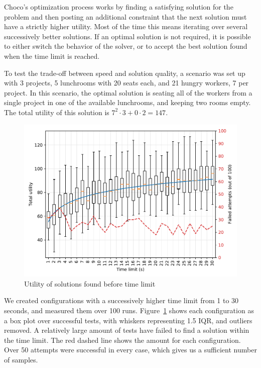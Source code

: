Choco's optimization process works by finding a satisfying solution for the problem and
then posting an additional constraint that the next solution must have a strictly higher
utility. Most of the time this means iterating over several successively better
solutions. If an optimal solution is not required, it is possible to either switch the
behavior of the solver, or to accept the best solution found when the time limit is
reached.

To test the trade-off between speed and solution quality, a scenario was set up with 3
projects, 5 lunchrooms with 20 seats each, and 21 hungry workers, 7 per project. In
this scenario, the optimal solution is seating all of the workers from a single project
in one of the available lunchrooms, and keeping two rooms empty. The total utility
of this solution is $7^2 \cdot 3 + 0 \cdot 2 = 147$.

\begin{figure}[ht]
    \centering
    \includegraphics[width=1\linewidth]{img/timelimits.pdf}
    \caption{Utility of solutions found before time limit}
    \label{fig:timelimits}
\end{figure}

We created configurations with a successively higher time limit from 1 to 30 seconds,
and measured them over 100 runs. Figure~\ref{fig:timelimits} shows each configuration as
a box plot over successful tests, with whiskers representing 1.5 IQR, and outliers
removed. A relatively large amount of tests have failed to find a solution within the
time limit. The red dashed line shows the amount for each configuration. Over 50
attempts were successful in every case, which gives us a sufficient number of samples.


